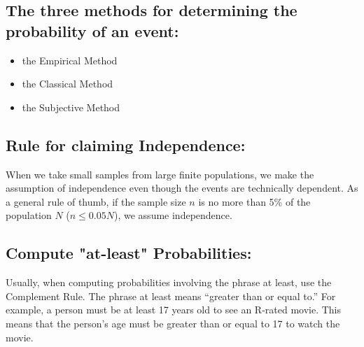 \documentclass{report}
\begin{document}
    \subsection*{The three methods for determining the probability of an event:}
    \bigbreak \noindent 
    \begin{itemize}
        \item the Empirical Method
        \item the Classical Method
        \item the Subjective Method
    \end{itemize}
    \pagebreak


    \bigbreak \noindent \bigbreak \noindent 
    \subsection*{Rule for claiming Independence:}
    \bigbreak \noindent 
    When we take small samples from large finite populations, we make the assumption of independence even though the events are technically dependent.
    \bigbreak \noindent 
    As a general rule of thumb, if the sample size $n $ is no more than 5\% of the population $N $ ($n \leq 0.05 N $), we assume independence.

    \bigbreak \noindent \bigbreak \noindent 
    \subsection*{Compute "at-least" Probabilities:}
    \bigbreak \noindent 
      Usually, when computing probabilities involving the phrase at least, use the Complement Rule.
    \bigbreak \noindent 
    The phrase at least means “greater than or equal to.” For example, a person must be at least 17 years old to see an R-rated movie. This means that the person's age must be greater than or equal to 17 to watch the movie.

    \bigbreak \noindent \bigbreak \noindent 
\end{document}
